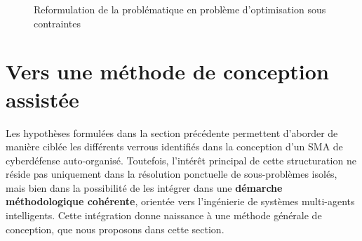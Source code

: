 \documentclass[ twoside,openright,titlepage,numbers=noenddot,headinclude,%
                footinclude=true,cleardoublepage=empty,abstractoff, %
                BCOR=5mm,paper=a4,fontsize=11pt,%
                french,american,%
                ]{scrreprt}
\begin{document}
\begin{figure}[H]
    \centering
    \caption{Reformulation de la problématique en problème d'optimisation sous contraintes}
    \label{fig:constrained_optimization_overview}
\end{figure}

\section{Vers une méthode de conception assistée}\label{sec:method-response}


Les hypothèses formulées dans la section précédente permettent d'aborder de manière ciblée les différents verrous identifiés dans la conception d'un SMA de cyberdéfense auto-organisé. Toutefois, l'intérêt principal de cette structuration ne réside pas uniquement dans la résolution ponctuelle de sous-problèmes isolés, mais bien dans la possibilité de les intégrer dans une \textbf{démarche méthodologique cohérente}, orientée vers l'ingénierie de systèmes multi-agents intelligents. Cette intégration donne naissance à une méthode générale de conception, que nous proposons dans cette section.
\end{document}
